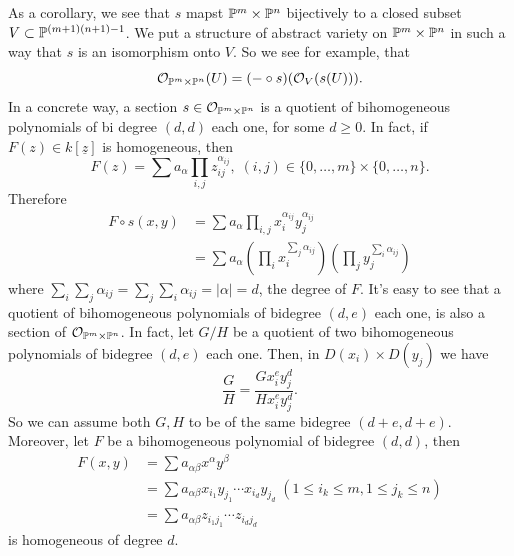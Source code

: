As a corollary, we see that $s$ mapst $\mathbb{P}^m\times\mathbb{P}^n$ bijectively to a closed subset $V\subset\mathbb{P}^{(m+1)(n+1)-1}$. 
We put a structure of abstract variety on $\mathbb{P}^m\times \mathbb{P}^n$ in such a way that $s$ is an isomorphism onto $V$. So we 
see for example, that 
\begin{equation}
    \mathcal{O}_{\mathbb{P}^m\times\mathbb{P}^n}(U)=(-\circ s)(\mathcal{O}_V(s(U))).
\end{equation}
In a concrete way, a section $s\in \mathcal{O}_{\mathbb{P}^m\times\mathbb{P}^n}$ is a quotient of bihomogeneous polynomials of bi degree $(d,d)$
each one, for some $d\geq0$. In fact, if $F(z)\in k[\underline{z}]$ is homogeneous, then 
\begin{equation}
    F(z)=\sum a_\alpha\prod_{i,j}z_{ij}^{\alpha_{ij}},\; (i,j)\in\{0,\dots,m\}\times\{0,\dots,n\}.
\end{equation}
Therefore 
\begin{equation}
    \begin{split}
        F\circ s (x,y) &= \sum a_\alpha\prod_{i,j}x_i^{\alpha_{ij}}y_j^{\alpha_{ij}}\\
             &=\sum a_\alpha(\prod_i x_i^{\sum_j\alpha_{ij}})(\prod_j y_j^{\sum_i\alpha_{ij}})
    \end{split}
\end{equation}
where $\sum_i \sum_j \alpha_{ij}=\sum_j\sum_i\alpha_{ij}=|\alpha|=d$, the degree of $F$. It's easy to see that a quotient of
bihomogeneous polynomials of bidegree $(d,e)$ each one, 
is also a section of $\mathcal{O}_{\mathbb{P}^m\times\mathbb{P}^n}$. In fact, let $G/H$ be a quotient of two bihomogeneous polynomials
of bidegree $(d,e)$ each one. Then, in $D(x_i)\times D(y_j)$ we have 
\begin{equation}
    \frac{G}{H} = \frac{G x_i^ey_j^d}{Hx_i^ey_j^d}.
\end{equation}
So we can assume both $G,H$ to be of the same bidegree $(d+e,d+e)$. Moreover, let $F$ be a bihomogeneous polynomial 
of bidegree $(d,d)$, then 
\begin{equation}
    \begin{split}
        F(x,y) &= \sum a_{\alpha\beta}x^\alpha y^\beta\\
        &=\sum a_{\alpha\beta} x_{i_1} y_{j_1}\cdots x_{i_d}y_{j_d}\; (1\leq i_k\leq m, 1\leq j_k\leq n)\\
        &=\sum a_{\alpha\beta} z_{i_1j_1}\cdots z_{i_dj_d}
    \end{split}
\end{equation}
is homogeneous of degree $d$.

